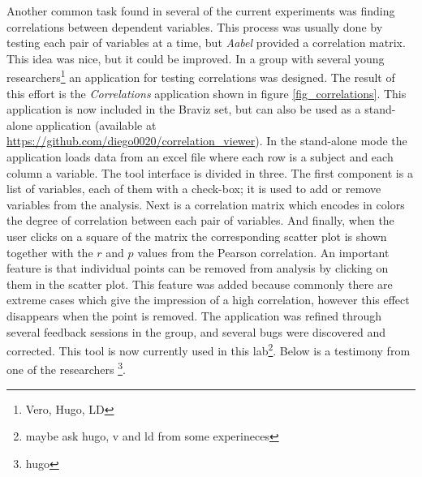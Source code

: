 Another common task found in several of the current experiments was finding correlations between dependent variables. This process was usually done by testing each pair of variables at a time, but \emph{Aabel} provided a correlation matrix. This idea was nice, but it could be improved. In a group with several young researchers\footnote{Vero, Hugo, LD} an application for testing correlations was designed. The result of this effort is the \emph{Correlations} application shown in figure \ref{fig_correlations}. This application is now included in the Braviz set, but can also be used as a stand-alone application (available at \url{https://github.com/diego0020/correlation_viewer}). In the stand-alone mode the application loads data from an excel file where each row is a subject and each column a variable. The tool interface is divided in three. The first component is a list of variables, each of them with a check-box; it is used to add or remove variables from the analysis. Next is a correlation matrix which encodes in colors the degree of correlation between each pair of variables. And finally, when the user clicks on a square of the matrix the corresponding scatter plot is shown together with the $r$ and $p$ values from the Pearson correlation. An important feature is that individual points can be removed from analysis by clicking on them in the scatter plot. This feature was added because commonly there are extreme cases which give the impression of a high correlation, however this effect disappears when the point is removed. The application was refined through several feedback sessions in the group, and several bugs were discovered and corrected.  This tool is now currently used in this lab\footnote{maybe ask hugo, v and ld from some experineces}. Below is a testimony from one of the researchers \footnote{hugo}.

